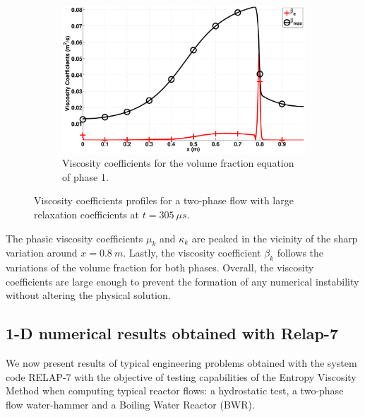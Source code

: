 \documentclass[preprint,10pt]{elsarticle}
\begin{document}
\begin{figure}[H]
        \begin{subfigure}[b]{0.495\textwidth}
                \centering
                \includegraphics[width=\textwidth]{figures/nozzle-aint-1e4_liquid_beta.eps}
                \caption{Viscosity coefficients for the volume fraction equation of phase 1.}
                \label{fig:nozzle-aint-1e4-beta}
        \end{subfigure}        
        \caption{Viscosity coefficients profiles for a two-phase flow with large relaxation coefficients at $t=305 \ \mu s$.}\label{fig:nozzle-aint-1e4-visc-coeff}
\end{figure}
%
The phasic viscosity coefficients $\mu_k$ and $\kappa_k$ are peaked in the vicinity of the sharp variation around $x=0.8 \ m$. Lastly, the viscosity coefficient $\beta_k$ follows the variations of the volume fraction for both phases. Overall, the viscosity coefficients are large enough to prevent the formation of any numerical instability without altering the physical solution.
%
\subsection{1-D numerical results obtained with Relap-7}\label{sec:1d-results-relap-7}
%
We now present results of typical engineering problems obtained with the system code RELAP-7 \cite{Berry_2014} with the objective of testing capabilities of the Entropy Viscosity Method when computing typical reactor flows: a hydrostatic test, a two-phase flow water-hammer and a Boiling Water Reactor (BWR).
 
%
\end{document}
